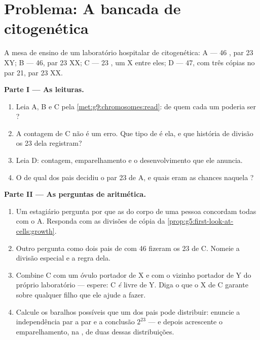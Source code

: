 \section{Problema: A bancada de citogenética}

\begin{problem}\label{pb:g9:chromosomes:1}
A mesa de ensino de um laboratório hospitalar de
citogenética:  A --- 46 , par 23 XY; B
--- 46, par 23 XX; C --- 23 , um X entre eles; D
--- 47, com três cópias no par 21, par 23 XX.

\medskip\noindent\textbf{Parte I --- As leituras.}
\begin{enumerate}
  \item Leia A, B e C pela
        \cref{met:g9:chromosomes:read}: de quem cada um
        poderia ser ?
  \item A contagem de C não é um erro. Que tipo de  é
        ela, e que história de divisão os 23 dela registram?
  \item Leia D: contagem, emparelhamento e o
        desenvolvimento que ele anuncia.
  \item O  de qual dos pais decidiu o par 23 de A, e
        quais eram as chances naquela ?
\end{enumerate}

\medskip\noindent\textbf{Parte II --- As perguntas de
aritmética.}
\begin{enumerate}[resume]
  \item Um estagiário pergunta por que as  do corpo
        de uma pessoa concordam todas com o  A.
        Responda com as divisões de cópia da
        \cref{prop:g5:first-look-at-cells:growth}.
  \item Outro pergunta como dois pais de  com 46
        fizeram os 23 de C. Nomeie a divisão especial e a
        regra dela.
  \item Combine C com um óvulo portador de X e com o
        vizinho portador de Y do próprio laboratório ---
        espere: C \emph{é} livre de Y. Diga o que o X de C
        garante sobre qualquer filho que ele ajude a fazer.
  \item Calcule os baralhos possíveis que um dos pais pode
        distribuir: enuncie a independência par a par e a
        conclusão $2^{23}$ --- e depois acrescente o
        emparelhamento, na , de duas dessas
        distribuições.
\end{enumerate}


\end{problem}
